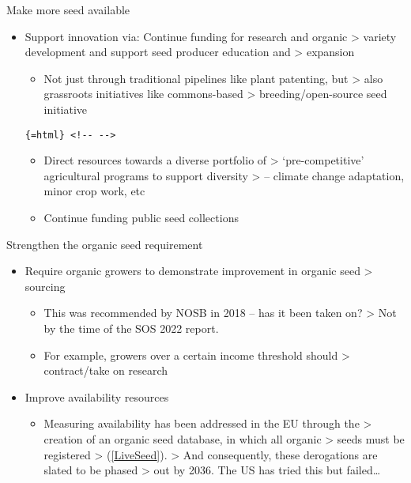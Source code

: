 \documentclass[twoside,12pt,final]{ucthesis-CA2012}
\providecommand{\tightlist}{%
  \setlength{\itemsep}{0pt}\setlength{\parskip}{0pt}}
\begin{document}
\begin{ucmainmatter}
Make more seed available
\begin{itemize}
\item
  Support innovation via: Continue funding for research and organic
  \textgreater{} variety development and support seed producer education and
  \textgreater{} expansion
  \begin{itemize}
  \tightlist
  \item
    Not just through traditional pipelines like plant patenting, but
    \textgreater{} also grassroots initiatives like commons-based
    \textgreater{} breeding/open-source seed initiative
  \end{itemize}
  \texttt{\{=html\}\ \textless{}!-\/-\ -\/-\textgreater{}}
  \begin{itemize}
  \item
    Direct resources towards a diverse portfolio of
    \textgreater{} `pre-competitive' agricultural programs to support diversity
    \textgreater{} -- climate change adaptation, minor crop work, etc
  \item
    Continue funding public seed collections
  \end{itemize}
\end{itemize}
Strengthen the organic seed requirement
\begin{itemize}
\item
  Require organic growers to demonstrate improvement in organic seed
  \textgreater{} sourcing
  \begin{itemize}
  \item
    This was recommended by NOSB in 2018 -- has it been taken on?
    \textgreater{} Not by the time of the SOS 2022 report.
  \item
    For example, growers over a certain income threshold should
    \textgreater{} contract/take on research
  \end{itemize}
\item
  Improve availability resources
  \begin{itemize}
  \tightlist
  \item
    Measuring availability has been addressed in the EU through the
    \textgreater{} creation of an organic seed database, in which all organic
    \textgreater{} seeds must be registered
    \textgreater{} (\href{https://www.liveseed.eu/wp-content/uploads/2021/09/Policy-brief-RoadMap-National-Authorities_final_compressed-4.pdf}{{[}LiveSeed{]}}).
    \textgreater{} And consequently, these derogations are slated to be phased
    \textgreater{} out by 2036. The US has tried this but failed\ldots{}

\end{itemize}
\end{itemize}
\end{ucmainmatter}
\end{document}

